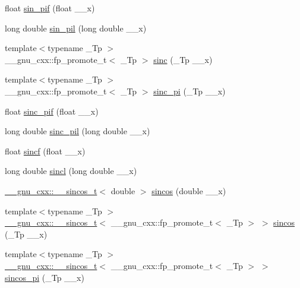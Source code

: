 \begin{DoxyCompactItemize}
float \hyperlink{group__mathsf__gnu_ga74fc8e2dd770850e7ea8bf8a28a71777}{sin\+\_\+pif} (float \+\_\+\+\_\+x)
\item 
long double \hyperlink{group__mathsf__gnu_ga0bda860961b0a121e266b278f260634b}{sin\+\_\+pil} (long double \+\_\+\+\_\+x)
\item 
{\footnotesize template$<$typename \+\_\+\+Tp $>$ }\\\+\_\+\+\_\+gnu\+\_\+cxx\+::fp\+\_\+promote\+\_\+t$<$ \+\_\+\+Tp $>$ \hyperlink{group__mathsf__gnu_ga09976b5d041113979c93613cc3700348}{sinc} (\+\_\+\+Tp \+\_\+\+\_\+x)
\item 
{\footnotesize template$<$typename \+\_\+\+Tp $>$ }\\\+\_\+\+\_\+gnu\+\_\+cxx\+::fp\+\_\+promote\+\_\+t$<$ \+\_\+\+Tp $>$ \hyperlink{group__mathsf__gnu_ga5195270024403b985e7d4f2f935f8779}{sinc\+\_\+pi} (\+\_\+\+Tp \+\_\+\+\_\+x)
\item 
float \hyperlink{group__mathsf__gnu_gad92d43d5332c80d1a27c90bfe3f6417e}{sinc\+\_\+pif} (float \+\_\+\+\_\+x)
\item 
long double \hyperlink{group__mathsf__gnu_gaad38a6e40b1272391a26dbb32a684b3c}{sinc\+\_\+pil} (long double \+\_\+\+\_\+x)
\item 
float \hyperlink{group__mathsf__gnu_gaa87f0734cfe7823c932511ac2f0a876c}{sincf} (float \+\_\+\+\_\+x)
\item 
long double \hyperlink{group__mathsf__gnu_ga79a8fd931f5ad4f737e2931e636149ac}{sincl} (long double \+\_\+\+\_\+x)
\item 
\hyperlink{struct____gnu__cxx_1_1____sincos__t}{\+\_\+\+\_\+gnu\+\_\+cxx\+::\+\_\+\+\_\+sincos\+\_\+t}$<$ double $>$ \hyperlink{group__mathsf__gnu_ga8041c24b528475bcf8a4178e484652a3}{sincos} (double \+\_\+\+\_\+x)
\item 
{\footnotesize template$<$typename \+\_\+\+Tp $>$ }\\\hyperlink{struct____gnu__cxx_1_1____sincos__t}{\+\_\+\+\_\+gnu\+\_\+cxx\+::\+\_\+\+\_\+sincos\+\_\+t}$<$ \+\_\+\+\_\+gnu\+\_\+cxx\+::fp\+\_\+promote\+\_\+t$<$ \+\_\+\+Tp $>$ $>$ \hyperlink{group__mathsf__gnu_ga5d3a375ada451e0a9a78441ddfcf52a3}{sincos} (\+\_\+\+Tp \+\_\+\+\_\+x)
\item 
{\footnotesize template$<$typename \+\_\+\+Tp $>$ }\\\hyperlink{struct____gnu__cxx_1_1____sincos__t}{\+\_\+\+\_\+gnu\+\_\+cxx\+::\+\_\+\+\_\+sincos\+\_\+t}$<$ \+\_\+\+\_\+gnu\+\_\+cxx\+::fp\+\_\+promote\+\_\+t$<$ \+\_\+\+Tp $>$ $>$ \hyperlink{group__mathsf__gnu_ga6553883f127ea0de67041c3128e03813}{sincos\+\_\+pi} (\+\_\+\+Tp \+\_\+\+\_\+x)

\end{DoxyCompactItemize}
